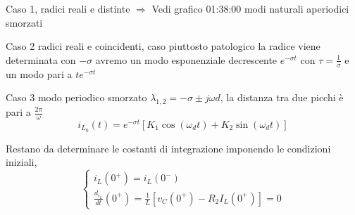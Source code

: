 Caso 1, radici reali e distinte $\Rightarrow$
Vedi grafico 01:38:00 modi naturali aperiodici smorzati

Caso 2 radici reali e coincidenti, caso piuttosto patologico
la radice viene determinata con $-\sigma$ avremo un modo esponenziale decrescente $e^{-\sigma t} $ con $\tau = \frac{1}{\sigma}$
e un modo pari a  $te^{-\sigma t}$

Caso 3 modo periodico smorzato
$\lambda_{1,2} = -\sigma \pm j\omega d$, la distanza tra due picchi è pari a $\frac{2\pi}{\omega}$
$$i_{L_0}(t) = e^{-\sigma t} [K_1 \cos (\omega_d t) + K_2 \sin(\omega_d t)]$$

Restano da determinare le costanti di integrazione imponendo le condizioni iniziali,
\begin{equation*}
\begin{cases}
i_L(0^+) = i_L(0^-) \\
\frac{d_{i_L}}{dt}(0^+) = \frac{1}{L}[v_C(0^+) - R_2I_L(0^+)] = 0
\end{cases}
\end{equation*}
